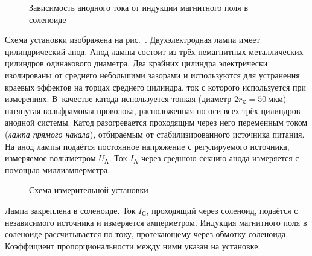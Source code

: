 \begin{figure}[h]
    \centering
    \caption{Зависимость анодного тока от индукции магнитного поля в соленоиде}
\end{figure}

Схема установки изображена на рис.~. Двухэлектродная
лампа имеет цилиндрический анод. Анод лампы состоит из трёх немагнитных металлических 
цилиндров одинакового диаметра.
Два крайних цилиндра электрически изолированы от среднего небольшими зазорами и
используются для устранения краевых эффектов на торцах среднего цилиндра, ток с
которого используется при измерениях. В~качестве катода используется тонкая
(диаметр $2r_{К}=50~\text{мкм}$) натянутая вольфрамовая проволока, расположенная по оси
всех трёх цилиндров анодной системы. Катод разогревается проходящим 
через него переменным током (\emph{лампа прямого накала}),
отбираемым от стабилизированного источника питания. 
На анод лампы подаётся постоянное напряжение с регулируемого источника, 
измеряемое вольтметром $U_{А}$. Ток $I_{А}$ через среднюю секцию анода  
измеряется с помощью миллиамперметра.

\begin{figure}[h]
    \centering
	\caption{Схема измерительной установки}
\end{figure}

Лампа закреплена в соленоиде. Ток $I_{С}$, проходящий через соленоид, подаётся с
независимого источника и измеряется амперметром. Индукция магнитного поля в
соленоиде рассчитывается по току, протекающему через обмотку соленоида.
Коэффициент пропорциональности между ними указан на установке.


